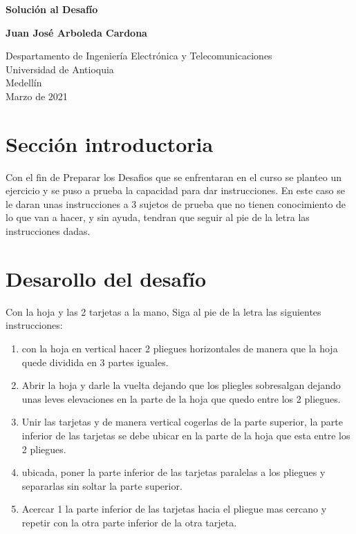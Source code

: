 \documentclass{article}
\begin{document}
\begin{titlepage}
    \begin{center}
        \vspace*{1cm}
            
        \Huge
        \textbf{Solución  al Desafío }
            
        \vspace{0.5cm}
        \LARGE
 
            
        \vspace{1.5cm}
            
        \textbf{Juan José Arboleda Cardona}
            
        \vfill
            
        \vspace{0.8cm}
            
        \Large
        Despartamento de Ingeniería Electrónica y Telecomunicaciones\\
        Universidad de Antioquia\\
        Medellín\\
        Marzo de 2021
            
    \end{center}
\end{titlepage}

\tableofcontents
\newpage
\section{Sección introductoria}\label{intro}
Con el fin de Preparar los Desafios que se enfrentaran en el curso se planteo un ejercicio y se puso a prueba la capacidad para dar instrucciones. En este caso se le daran unas instrucciones a 3 sujetos de prueba que no tienen conocimiento de lo que van a hacer, y sin ayuda, tendran que seguir al pie de la letra las instrucciones dadas.

\section{Desarollo del desafío} \label{contenido}
Con la hoja y las 2 tarjetas  a la mano, Siga al pie de la letra las siguientes instrucciones:
\begin{enumerate}
 \item con la hoja en vertical hacer 2 pliegues horizontales de manera que la hoja quede dividida en 3 partes iguales. 
 \item Abrir la hoja y darle la vuelta dejando que los pliegles sobresalgan dejando unas leves elevaciones en la parte de la hoja que quedo entre los 2 pliegues.
 \item Unir las tarjetas y de manera vertical cogerlas de la parte superior, la parte inferior de las tarjetas se debe ubicar en la parte de la hoja que esta entre los 2 pliegues. 
 \item ubicada, poner la parte inferior de las tarjetas paralelas a los pliegues y separarlas sin soltar la parte superior. 
 \item Acercar 1 la parte inferior de las tarjetas hacia el pliegue mas cercano y repetir con la otra parte inferior de la otra tarjeta.   
 \end{enumerate}
\end{document}
